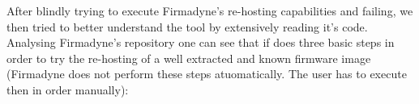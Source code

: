 \begin{table}[H]
\centering
\caption{First results when experimenting with Re-hosting via Firmadyne. Firmware images selected at random. Minimal Firmadyne automation involved.}
\label{tab:fist-rehosting}
\end{table}

After blindly trying to execute Firmadyne's re-hosting capabilities and failing, we then tried to better understand the tool by extensively reading it's code. Analysing Firmadyne's repository one can see that if does three basic steps in order to try the re-hosting of a well extracted and known firmware image (Firmadyne does not perform these steps atuomatically. The user has to execute then in order manually):

